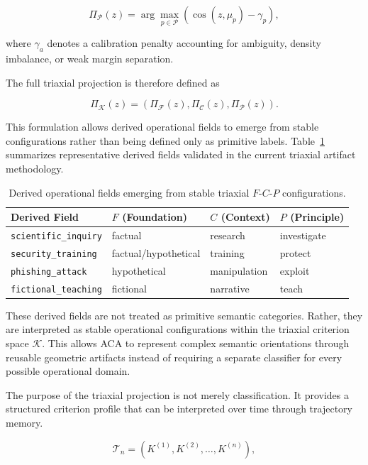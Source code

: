 \documentclass[11pt]{article}
\begin{document}
$$
\Pi_{\mathcal{P}}(z)
=
\arg\max_{p\in\mathcal{P}}
\left(
\cos(z,\mu_p)-\gamma_p
\right),
$$

where $\gamma_a$ denotes a calibration penalty accounting for ambiguity, density imbalance, or weak margin separation.

The full triaxial projection is therefore defined as

$$
\Pi_{\mathcal{K}}(z)
=
\left(
\Pi_{\mathcal{F}}(z),
\Pi_{\mathcal{C}}(z),
\Pi_{\mathcal{P}}(z)
\right).
$$

This formulation allows derived operational fields to emerge from stable configurations rather than being defined only as primitive labels. Table~\ref{tab:derived-fields} summarizes representative derived fields validated in the current triaxial artifact methodology.

\begin{table}[htbp]
\centering
\begin{tabular}{llll}
\hline
\textbf{Derived Field} & \textbf{$F$ (Foundation)} & \textbf{$C$ (Context)} & \textbf{$P$ (Principle)} \\
\hline
\texttt{scientific\_inquiry}   & factual          & research      & investigate \\
\texttt{security\_training}    & factual/hypothetical & training   & protect \\
\texttt{phishing\_attack}      & hypothetical     & manipulation  & exploit \\
\texttt{fictional\_teaching}   & fictional        & narrative     & teach \\
\hline
\end{tabular}
\caption{Derived operational fields emerging from stable triaxial $F$-$C$-$P$ configurations.}
\label{tab:derived-fields}
\end{table}

These derived fields are not treated as primitive semantic categories. Rather, they are interpreted as stable operational configurations within the triaxial criterion space $\mathcal{K}$. This allows ACA to represent complex semantic orientations through reusable geometric artifacts instead of requiring a separate classifier for every possible operational domain.

The purpose of the triaxial projection is not merely classification. It provides a structured criterion profile that can be interpreted over time through trajectory memory.

$$
\mathcal{T}_n
=
\left(
K^{(1)},K^{(2)},\dots,K^{(n)}
\right),
$$
\end{document}
